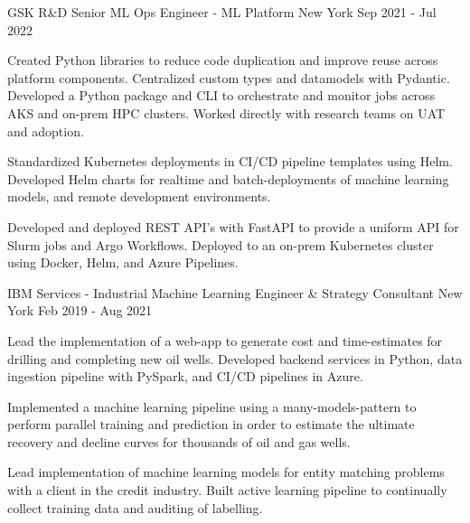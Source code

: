 \begin{cventries}
\cventrywide
  {GSK R\&D} %
  {Senior ML Ops Engineer - ML Platform} %
  {New York} %
  {Sep 2021 - Jul 2022} %
  {
    \begin{cvitems} %
      \item { Created Python libraries to reduce code duplication and improve reuse across platform components. Centralized custom types and datamodels with Pydantic. Developed a Python package and CLI to orchestrate and monitor jobs across AKS and on-prem HPC clusters. Worked directly with research teams on UAT and adoption. }
      \item { Standardized Kubernetes deployments in CI/CD pipeline templates using Helm. Developed Helm charts for realtime and batch-deployments of machine learning models, and remote development environments. }
      \item { Developed and deployed REST API's with FastAPI to provide a uniform API for Slurm jobs and Argo Workflows. Deployed to an on-prem Kubernetes cluster using Docker, Helm, and Azure Pipelines. }
    \end{cvitems}
  }
  \cventrywide
    {IBM Services - Industrial}  %
    {Machine Learning Engineer \& Strategy Consultant} %
    {New York} %
    {Feb 2019 - Aug 2021} %
    {
      \begin{cvitems} %
        \item {Lead the implementation of a web-app to generate cost and time-estimates for drilling and completing new oil wells. Developed backend services in Python, data ingestion pipeline with PySpark, and CI/CD pipelines in Azure.}
        \item {Implemented a machine learning pipeline using a many-models-pattern to perform parallel training and prediction in order to estimate the ultimate recovery and decline curves for thousands of oil and gas wells.}
        \item {Lead implementation of machine learning models for entity matching problems with a client in the credit industry. Built active learning pipeline to continually collect training data and auditing of labelling. }
      \end{cvitems}
    }


\end{cventries}
